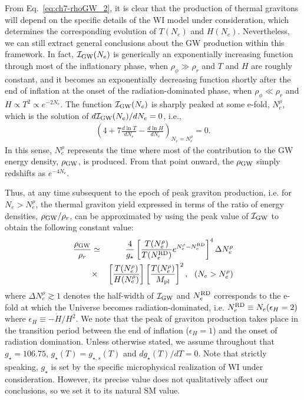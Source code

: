 From Eq.~\eqref{eq:ch7-rhoGW_2}, it is clear that the production of thermal gravitons will depend on the specific details of the WI model under consideration, which determines the corresponding evolution of  $T(N_e)$ and $H(N_e)$.
Nevertheless, we can still extract general conclusions about the GW production within this framework. In fact, $\mathcal{I}_{\rm GW}(N_e)$ is generically an exponentially increasing function through most of the inflationary phase, when $\rho_\phi\gg \rho_r$ and $T$ and $H$ are roughly constant, and it becomes an exponentially decreasing function shortly after the end of inflation at the onset of the radiation-dominated phase, when $\rho_\phi\ll \rho_r$ and $H\propto T^2 \propto e^{-2 N_e}$. The function $\mathcal{I}_{\rm GW}(N_e)$
is sharply peaked at some e-fold, $N_e^\rho$, which is the solution of  $d \mathcal{I}_{\rm GW}(N_e) / dN_e = 0$, i.e.,
\begin{eqnarray} \left(
4+7\frac{d\ln T}{d N_e}-\frac{d\ln H}{d N_e}\right)_{N_e=N_e^{\rho}}=0.
\label{eq:ch7-Nepeak}
\end{eqnarray}
In this sense, $N_e^\rho$ represents the time where most of the contribution to the GW energy density, $\rho_{\rm GW}$, is produced. From that point onward, the $\rho_{\rm GW}$ simply redshifts as $e^{-4N_e}$.

Thus, at any time subsequent to the epoch of peak graviton production, i.e.  for $N_e > N_e^{\rho}$,
the thermal graviton yield  expressed in terms of the ratio of energy densities, $\rho_{\rm GW}/\rho_r$,
can be approximated by using the peak value of $\mathcal{I}_{\rm GW}$ to obtain the following constant value:
\begin{eqnarray}
   \nonumber \frac{\rho_{\rm GW}}{\rho_r}&\simeq&\frac{4}{g_{\star}}\left[\frac{T(N_e^{\rho})}{T(N_e^{\rm RD})}e^{N_e^{\rho}-N_e^{\rm RD}}\right]^4\Delta N_{e}^{\rho} \\
   &\times& \left[\frac{T(N_e^{\rho})}{ H(N_e^{\rho})}\right]\left[\frac{T(N_e^{\rho})}{ M_{\rm pl}}\right]^2,  \,\,\,\,(N_e>N_e^\rho )
   \label{eq:ch7-estrhoratio}
\end{eqnarray}
where $\Delta N_e^{\rho}\gtrsim 1$ denotes the
half-width of $\mathcal{I}_{\rm GW}$ and  $N_e^{\rm{RD}}$ corresponds to the e-fold at which the Universe becomes radiation-dominated, i.e. $N_e^{\rm{RD}}\equiv N_e(\epsilon_H=2)$ where $\epsilon_H\equiv -\dot{H}/H^2$.
We note that the peak of graviton production takes place in the transition period between the end of inflation ($\epsilon_H =1$) and the onset of radiation domination.
Unless otherwise stated, we assume throughout that
$g_\star=106.75$, $g_\star(T)=g_{\star,s}(T)$ and $dg_\star(T)/dT=0$. Note that strictly speaking,
$g_\star$ is set by the specific microphysical realization of WI under consideration. However, its precise value does not qualitatively affect our conclusions, so we set it to its natural SM value.

